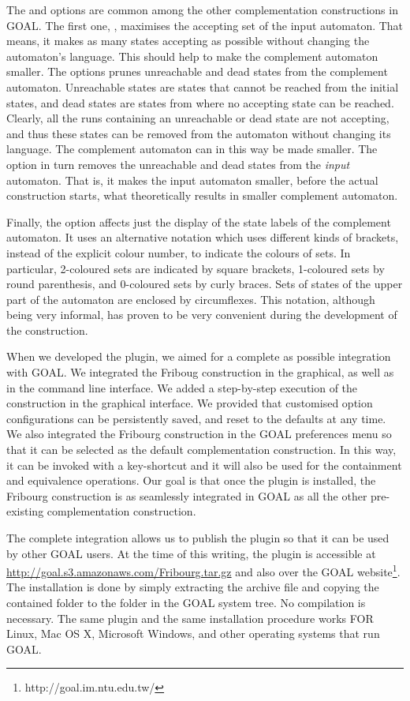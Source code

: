 The  and  options are common among the other complementation constructions in GOAL. The first one, , maximises the accepting set of the input automaton. That means, it makes as many states accepting as possible without changing the automaton's language. This should help to make the complement automaton smaller. The  options prunes unreachable and dead states from the complement automaton. Unreachable states are states that cannot be reached from the initial states, and dead states are states from where no accepting state can be reached. Clearly, all the runs containing an unreachable or dead state are not accepting, and thus these states can be removed from the automaton without changing its language. The complement automaton can in this way be made smaller. The  option in turn removes the unreachable and dead states from the \emph{input} automaton. That is, it makes the input automaton smaller, before the actual construction starts, what theoretically results in smaller complement automaton.

Finally, the  option affects just the display of the state labels of the complement automaton. It uses an alternative notation which uses different kinds of brackets, instead of the explicit colour number, to indicate the colours of sets. In particular, 2-coloured sets are indicated by square brackets, 1-coloured sets by round parenthesis, and 0-coloured sets by curly braces. Sets of states of the upper part of the automaton are enclosed by circumflexes. This notation, although being very informal, has proven to be very convenient during the development of the construction.

When we developed the plugin, we aimed for a complete as possible integration with GOAL. We integrated the Friboug construction in the graphical, as well as in the command line interface. We added a step-by-step execution of the construction in the graphical interface. We provided that customised option configurations can be persistently saved, and reset to the defaults at any time. We also integrated the Fribourg construction in the GOAL preferences menu so that it can be selected as the default complementation construction. In this way, it can be invoked with a key-shortcut and it will also be used for the containment and equivalence operations. Our goal is that once the plugin is installed, the Fribourg construction is as seamlessly integrated in GOAL as all the other pre-existing complementation construction.

The complete integration allows us to publish the plugin so that it can be used by other GOAL users. At the time of this writing, the plugin is accessible at \url{http://goal.s3.amazonaws.com/Fribourg.tar.gz} and also over the GOAL website\footnote{http://goal.im.ntu.edu.tw/}. The installation is done by simply extracting the archive file and copying the contained folder to the  folder in the GOAL system tree. No compilation is necessary. The same plugin and the same installation procedure works FOR Linux, Mac OS X, Microsoft Windows, and other operating systems that run GOAL.

